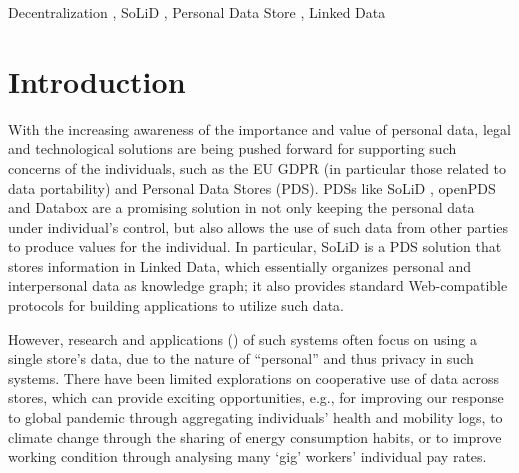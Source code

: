 \documentclass[
twocolumn,
]{ceurart}
\begin{document}
\begin{keywords}
  Decentralization \sep
  SoLiD  \sep
  Personal Data Store \sep
  Linked Data
\end{keywords}

\maketitle


\section{Introduction}

With the increasing awareness of the importance and value of personal data, legal and technological solutions are being pushed forward for supporting such concerns of the individuals, such as the EU GDPR \cite{noauthor_general_2016} (in particular those related to data portability) and Personal Data Stores (PDS). PDSs like SoLiD \cite{sambra_solid_2016}, openPDS \cite{de_montjoye_openpds_2014} and Databox \cite{mortier_personal_2016} are a promising solution in not only keeping the personal data under individual's control, but also allows the use of such data from other parties to produce values for the individual. In particular, SoLiD is a PDS solution that stores information in Linked Data, which essentially organizes personal and interpersonal data as knowledge graph; it also provides standard Web-compatible protocols for building applications to utilize such data.


However, research and applications (\cite{perera_valorising_2017,zhao_privacy-preserving_2020}) of such systems often focus on using a single store's data, due to the nature of ``personal'' and thus privacy in such systems. There have been limited explorations on cooperative use of data across stores, which can provide exciting opportunities, e.g., for improving our response to global pandemic through aggregating individuals' health and mobility logs\cite{troncoso_decentralized_2020}, to climate change through the sharing of energy consumption habits\cite{baeck_using_2020}, or to improve working condition through analysing many `gig' workers' individual pay rates\cite{zhang_algorithmic_2022}.
\end{document}
